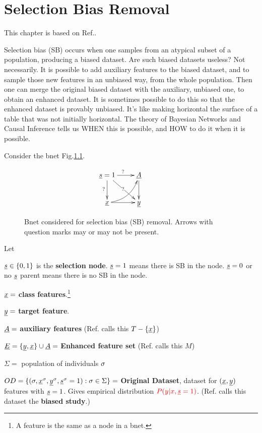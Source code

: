 \chapter{Selection Bias Removal}
\label{ch-sb-removal}
This chapter 
is based on Ref.\cite{bare-sb-removal}.

Selection bias (SB)
occurs when one 
samples from an
atypical subset
of a
population,
producing a biased dataset.
Are such biased 
datasets
useless? Not necessarily. 
It is possible to 
add auxiliary features
to the biased dataset, and to 
sample those new features
in an unbiased way,
 from the whole population.
Then
one can merge
the original
 biased dataset with the
auxiliary, unbiased one,
to obtain an enhanced dataset.
It is sometimes
possible to do this so that the enhanced
dataset is provably 
unbiased.
It's like making horizontal
the surface of a table
 that was
 not initially
horizontal.
The theory of Bayesian Networks and Causal
Inference tells us 
WHEN this is possible,
and HOW to do it
when it is possible.

Consider the bnet 
Fig.\ref{fig-bs-removal-basic}.

\begin{figure}[h!]
$$
\xymatrix{
\rvs=1\ar[dr]|?\ar[d]_?\ar[r]^?
&\rvA\ar[d]
&
\\
\rvx\ar[r]\ar@/_.9pc/[ru]
&\rvy
}
$$
\caption{Bnet considered for 
selection bias (SB) removal.
Arrows with question marks
may or may not be present.}
\label{fig-bs-removal-basic}
\end{figure}

Let

${\underline{s}}\in\{0,1\}$
is the {\bf selection node}.
${\underline{s}}=1$ means there is 
SB
in the node.
${\underline{s}}=0$ or no ${\underline{s}}$ parent
means there 
is no SB in the node.


${\underline{x}}=$ {\bf class features}.\footnote{
A feature is the same as a node in a bnet.}

${\underline{y}}=$ {\bf target feature}.

${\underline{A}}=$ {\bf auxiliary features}
(Ref.\cite{bare-sb-removal} 
calls this $T-\{{\underline{x}}\}$) 

${\underline{E}}=\{{\underline{y}}, {\underline{x}}\}\cup{\underline{A}}=$ 
{\bf Enhanced feature set}
(Ref.\cite{bare-sb-removal} calls this $M$) 

$\Sigma=$ population of individuals $\sigma$

$OD=\{(\sigma,{\underline{x}}^\sigma,  {\underline{y}}^\sigma,{\underline{s}}^\sigma=1):\sigma\in\Sigma\}=$ 
{\bf Original Dataset}, dataset for $({\underline{x}},{\underline{y}})$ features
with ${\underline{s}}=1$. 
Gives empirical
distribution $\color{red}{P(y|x, {\underline{s}}=1)}$.
(Ref.\cite{bare-sb-removal} 
calls this dataset the {\bf biased study}.)

